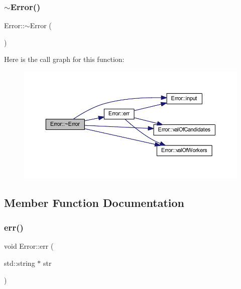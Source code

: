 \subsubsection{\texorpdfstring{$\sim$\+Error()}{~Error()}}
{\footnotesize\ttfamily Error\+::$\sim$\+Error (\begin{DoxyParamCaption}{ }\end{DoxyParamCaption})\hspace{0.3cm}{\ttfamily [inline]}}

Here is the call graph for this function\+:
\nopagebreak
\begin{figure}[H]
\begin{center}
\leavevmode
\includegraphics[width=350pt]{class_error_a1a45d42a3a035d510333cdfeb36a0e93_cgraph}
\end{center}
\end{figure}


\subsection{Member Function Documentation}
\hypertarget{class_error_a047207c59d0f2bedd19256e011abb80e}{}\label{class_error_a047207c59d0f2bedd19256e011abb80e} 
\subsubsection{\texorpdfstring{err()}{err()}}
{\footnotesize\ttfamily void Error\+::err (\begin{DoxyParamCaption}\item[{std\+::string $\ast$}]{str }\end{DoxyParamCaption})}

